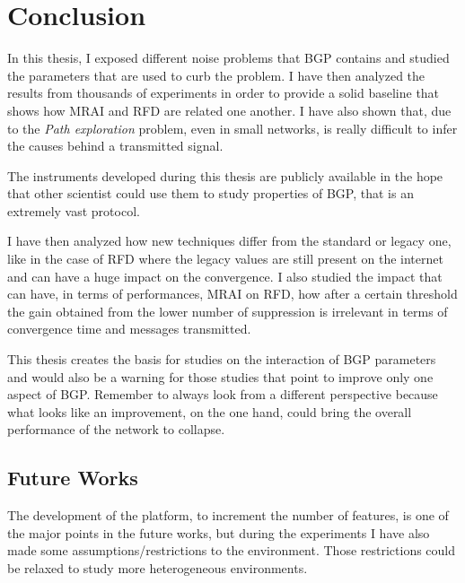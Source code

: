 \chapter{Conclusion}
\label{cha:conclusion}

In this thesis, I exposed different noise problems that \ac{BGP} contains and
studied the parameters that are used to curb the problem.
I have then analyzed the results from thousands of experiments in order to
provide a solid baseline that shows how \ac{MRAI} and \ac{RFD} are related
one another.
I have also shown that, due to the \textit{Path exploration} problem, even
in small networks, is really difficult to infer the causes behind a transmitted
signal.

The instruments developed during this thesis are publicly available in the
hope that other scientist could use them to study properties of \ac{BGP}, that
is an extremely vast protocol.

I have then analyzed how new techniques differ from the standard or legacy one,
like in the case of \ac{RFD} where the legacy values are still present on the
internet and can have a huge impact on the convergence.
I also studied the impact that can have, in terms of performances, \ac{MRAI} on \ac{RFD},
how after a certain threshold the gain obtained from the lower number of
suppression is irrelevant in terms of convergence time and messages transmitted.

This thesis creates the basis for studies on the interaction of \ac{BGP} parameters
and would also be a warning for those studies that point to improve only
one aspect of \ac{BGP}.
Remember to always look from a different perspective because what looks like an
improvement, on the one hand, could bring the overall performance of the
network to collapse.


\section{Future Works}
\label{sec:future_works}

The development of the platform, to increment the number of features, is one of
the major points in the future works, but during the experiments I have also
made some assumptions/restrictions to the environment.
Those restrictions could be relaxed to study more heterogeneous environments.

